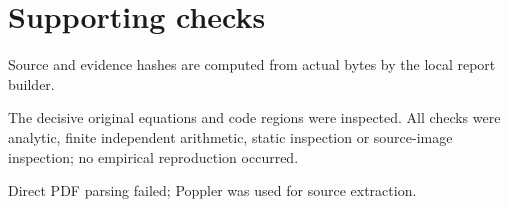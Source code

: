 \documentclass[10pt]{article}
\begin{document}
\section*{Supporting checks}
Source and evidence hashes are computed from actual bytes by the local report builder.\par
The decisive original equations and code regions were inspected. All checks were analytic, finite independent arithmetic, static inspection or source-image inspection; no empirical reproduction occurred.\par
Direct PDF parsing failed; Poppler was used for source extraction.\par
\end{document}
